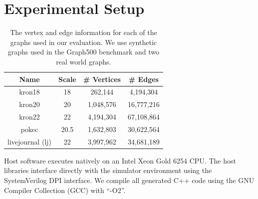 %


\section{Experimental Setup}

\begin{table}[]
    \centering
    \begin{tabular}{c|c|c|c}
     \textbf{Name} & \textbf{Scale} & \textbf{\# Vertices} & \textbf{\# Edges} \\ \hline %
     kron18 & 18 & 262,144 & 4,194,304 \\ \hline
     kron20 & 20 & 1,048,576 & 16,777,216 \\ \hline
     kron22 & 22 & 4,194,304 & 67,108,864 \\ \hline
     pokec & 20.5 & 1,632,803 & 30,622,564 \\ \hline
     livejournal (lj) & 22 & 3,997,962 & 34,681,189 \\ %
    \end{tabular}
    
    \caption{The vertex and edge information for each of the graphs used in our evaluation. We use synthetic \kron graphs used in the Graph500 benchmark and two real world graphs.}
    \label{sec:eval:tab:graphs}
\end{table}

Host software executes natively on an Intel Xeon Gold 6254 CPU.
The host libraries interface directly with the simulator environment using the SystemVerilog DPI interface.
We compile all generated C++ code using the GNU Compiler Collection (GCC) with ``-O2''.

